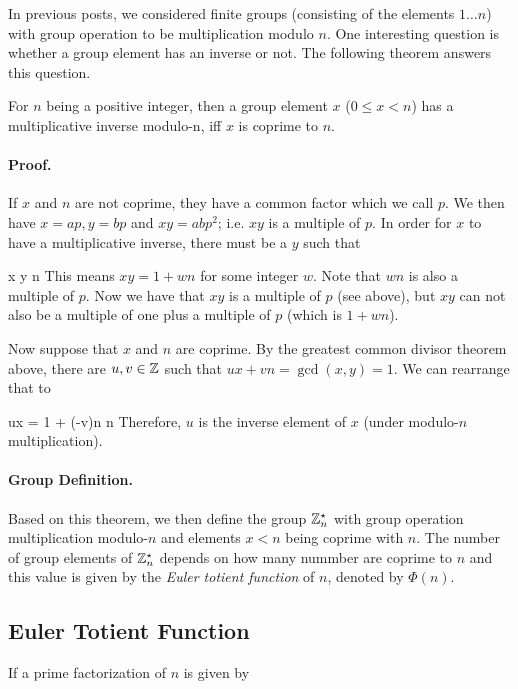 In previous posts, we considered finite groups (consisting of the elements $1 \ldots n$) with group operation to be multiplication modulo $n$. One interesting question is whether a group element has an inverse or not. The following theorem answers this question.

\begin{theorem}
For $n$ being a positive integer, then a group element $x$ ($0 \leq x < n$) has a multiplicative inverse modulo-n, iff $x$ is coprime to $n$.
\end{theorem}

\paragraph{Proof.} If $x$ and $n$ are not coprime, they have a common factor which we call $p$. We then have $x = ap, y = bp$ and $xy = abp^2$; i.e. $xy$ is a multiple of $p$. In order for $x$ to have a multiplicative inverse, there must be a $y$ such that

\bee
x y  \bmod n
\eee
%
This means $xy = 1 + wn$ for some integer $w$. Note that $wn$ is also a multiple of $p$. Now we have that $xy$ is a multiple of $p$ (see above), but $xy$ can not also be a multiple of one plus a multiple of $p$ (which is $1 + wn$).

Now suppose that $x$ and $n$ are coprime. By the greatest common divisor theorem above, there are $u,v \in \mathbb{Z}$ such that $ux + vn = \gcd(x,y) = 1$. We can rearrange that to

\be\label{gcd_01:inv}
ux = 1 + (-v)n \equiv \bmod n
\ee
%
Therefore, $u$ is the inverse element of $x$ (under modulo-$n$ multiplication).

\paragraph{Group Definition.} Based on this theorem, we then define the group $\mathbb{Z}_n^\star$ with group operation multiplication modulo-$n$ and elements $x < n$ being coprime with $n$. The number of group elements of $\mathbb{Z}_n^\star$ depends on how many nummber are coprime to $n$ and this value is given by the \emph{Euler totient function} of $n$, denoted by $\Phi(n)$.


\subsection{Euler Totient Function}

If a prime factorization of $n$ is given by

